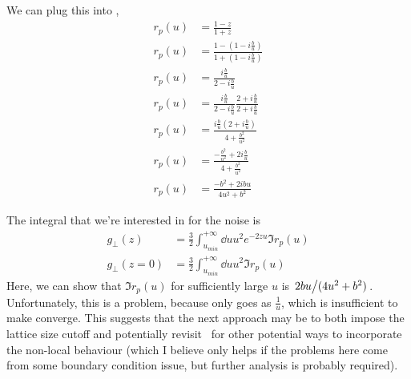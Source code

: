 \documentclass[11pt]{article}
\begin{document}
	We can plug this into ,
	\begin{align}
		r_p(u) &= \frac{1 - z}{1 + z} \\
		r_p(u) &= \frac{1 - (1 - i \frac{b}{u})}{1 + (1 - i \frac{b}{u})} \\
		r_p(u) &= \frac{i \frac{b}{u}}{2 - i \frac{b}{u}} \\
		r_p(u) &= \frac{i \frac{b}{u}}{2 - i \frac{b}{u}} \frac{2 + i \frac{b}{u}}{2 + i \frac{b}{u}} \\
		r_p(u) &= \frac{i \frac{b}{u}(2 + i \frac{b}{u})}{4 + \frac{b^2}{u^2}} \\
		r_p(u) &= \frac{- \frac{b^2}{u^2} + 2i \frac{b}{u}}{4 + \frac{b^2}{u^2}} \\
		r_p(u) &= \frac{- b^2 + 2i b u}{4 u^2+ b^2} \label{eq:imrp}
	\end{align}

	The integral that we're interested in for the noise is
	\begin{align}
		g_\perp(z) &= \frac32 \int_{u_{min}}^{+\infty} \dd{u} u^2 e^{-2 z u} \Im r_p(u) \\
		g_\perp(z = 0) &= \frac32 \int_{u_{min}}^{+\infty} \dd{u} u^2 \Im r_p(u) \label{eq:gperpsimplest}
	\end{align}
	Here, we can show that $\Im r_p(u)$ for sufficiently large $u$ is $\flatfrac{2 b u}{(4u^2 + b^2)}$.
	Unfortunately, this is a problem, because  only goes as $\frac{1}{u}$, which is insufficient to make  converge.
	This suggests that the next approach may be to both impose the lattice size cutoff and potentially revisit~\cite{Churchill2016} for other potential ways to incorporate the non-local behaviour (which I believe only helps if the problems here come from some boundary condition issue, but further analysis is probably required).

	\newpage
	\listoftodos
	\newpage
	\printbibliography
\end{document}
